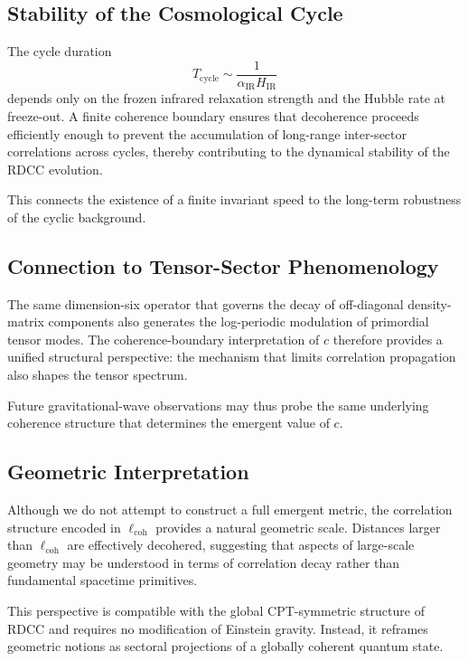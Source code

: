 \documentclass[11pt,a4paper]{article}
\begin{document}
\subsection{Stability of the Cosmological Cycle}

The cycle duration
\begin{equation}
    T_{\mathrm{cycle}} \sim \frac{1}{\alpha_{\mathrm{IR}} H_{\mathrm{IR}}}
\end{equation}
depends only on the frozen infrared relaxation strength and the Hubble rate at freeze-out.
A finite coherence boundary ensures that decoherence proceeds efficiently enough to prevent
the accumulation of long-range inter-sector correlations across cycles, thereby contributing to
the dynamical stability of the RDCC evolution.

This connects the existence of a finite invariant speed to the long-term robustness of the
cyclic background.

\subsection{Connection to Tensor-Sector Phenomenology}

The same dimension-six operator that governs the decay of off-diagonal density-matrix
components also generates the log-periodic modulation of primordial tensor modes. The
coherence-boundary interpretation of $c$ therefore provides a unified structural perspective:
the mechanism that limits correlation propagation also shapes the tensor spectrum.

Future gravitational-wave observations may thus probe the same underlying coherence
structure that determines the emergent value of $c$.

\subsection{Geometric Interpretation}

Although we do not attempt to construct a full emergent metric, the correlation structure
encoded in $\ell_{\mathrm{coh}}$ provides a natural geometric scale. Distances larger than
$\ell_{\mathrm{coh}}$ are effectively decohered, suggesting that aspects of large-scale geometry may
be understood in terms of correlation decay rather than fundamental spacetime primitives.

This perspective is compatible with the global CPT-symmetric structure of RDCC and
requires no modification of Einstein gravity. Instead, it reframes geometric notions as
sectoral projections of a globally coherent quantum state.
\end{document}
